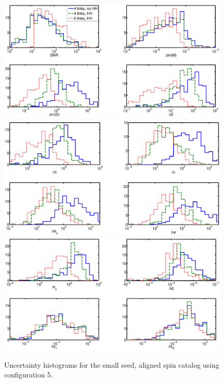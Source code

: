 \documentclass{iopart}
\begin{document}
\begin{figure}
\begin{center}
\includegraphics*[trim = 0mm 0mm 0mm 0mm, clip, scale=.28, angle=0]{FigSean/model_SE_1.eps}
\includegraphics*[trim = 0mm 0mm 0mm 0mm, clip, scale=.28, angle=0]{FigSean/model_SE_2.eps}
\includegraphics*[trim = 0mm 0mm 0mm 0mm, clip, scale=.28, angle=0]{FigSean/model_SE_3.eps}
\caption
{
Uncertainty histograms for the small seed, aligned spin catalog using configuration 5.
\vspace{10mm}}
\label{fig:SE}
\end{center}
\end{figure}
\end{document}
